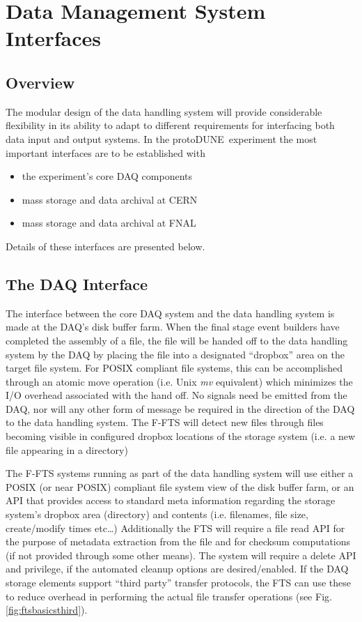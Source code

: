 \documentclass[pdftex,12pt,letter]{article}
\newcommand{\pd}{protoDUNE\ }
\begin{document}
\section{Data Management System Interfaces}
\subsection{Overview}
The modular design of the data handling system will provide considerable flexibility in its ability to adapt to different requirements
for interfacing  both data input and output systems.  In the \pd experiment the most important interfaces are to be established with
\begin{itemize}
\item the experiment’s core DAQ components
\item mass storage and data archival at CERN
\item mass storage and data archival at FNAL
\end{itemize}

\noindent
 Details of these interfaces are presented below.

\subsection{The DAQ Interface}
The interface between the core DAQ system and the data handling system is made at the DAQ’s disk buffer farm.
When the final stage event builders have completed the assembly of a file, the file will be handed off to the data handling system
by the DAQ by placing the file into a designated ``dropbox'' area on the target file system.  For POSIX compliant file systems,
this can be accomplished through an atomic move operation (i.e. Unix \textit{mv} equivalent) which minimizes the I/O overhead associated
with the hand off.  No signals need be emitted from the DAQ, nor will any other form of message be required in the direction of the
DAQ to the data handling system.  The F-FTS will detect new files through files becoming visible in configured dropbox locations of
the storage system (i.e. a new file appearing in a directory) 

The F-FTS systems running as part of the data handling system will use either a POSIX (or near POSIX) compliant file system view of the disk buffer farm,
or an API that provides access to standard meta information regarding the storage system’s dropbox area (directory) and contents
(i.e. filenames, file size, create/modify times etc…)  Additionally the FTS will require a file read API for the purpose of metadata
extraction from the file and for checksum computations (if not provided through some other means).  The system will require a
delete API and privilege, if the automated cleanup options are desired/enabled.  If the DAQ storage elements support ``third party''
transfer protocols, the FTS can use these to reduce overhead in performing the actual file transfer operations  (see Fig. \ref{fig:ftsbasicsthird}).
\end{document}

